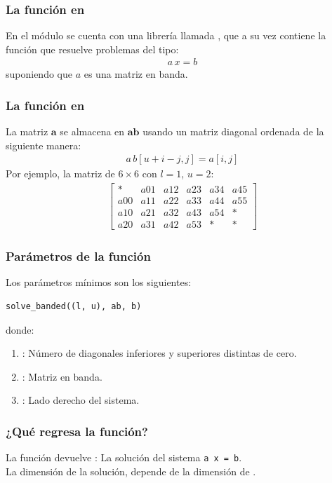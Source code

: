 \documentclass[12pt]{beamer}
\begin{document}
\begin{frame}
\frametitle{La función en }
En el módulo  se cuenta con una librería llamada , \pause que a su vez contiene la función  que resuelve problemas del tipo:
\begin{align*}
a \, x =  b
\end{align*}
suponiendo que $a$ es una matriz en banda.
\end{frame}
\begin{frame}
\frametitle{La función en }
La matriz $\mathbf{a}$ se almacena en $\mathbf{a b}$ usando un matriz diagonal ordenada de la siguiente manera:
\pause
\begin{align*}
a \, b [u + i - j, j] = a [i, j]
\end{align*}
\pause
Por ejemplo, la matriz de $6 \times 6$ con $l = 1$, $u = 2$:
\renewcommand{\arraystretch}{0.9}
\begin{align*}
\begin{bmatrix}
* & a01 & a12 & a23 & a34 & a45 \\
a00 & a11 & a22 & a33 & a44 & a55 \\
a10 & a21 & a32 & a43 & a54 & * \\
a20 & a31 & a42 & a53 & * & * 
\end{bmatrix}
\end{align*}
\end{frame}
\begin{frame}[fragile]
\frametitle{Parámetros de la función}
Los parámetros mínimos son los siguientes:
\pause
\begin{verbatim}
solve_banded((l, u), ab, b)
\end{verbatim}
\pause
donde:
\begin{enumerate}[<+->]
\item {}: Número de diagonales inferiores y superiores distintas de cero.
\item {}: Matriz en banda.
\item {}: Lado derecho del sistema.
\end{enumerate}
\end{frame}
\begin{frame}
\frametitle{¿Qué regresa la función?}
La función devuelve : La solución del sistema \texttt{a x = b}.
\\
\bigskip
La dimensión de la solución, depende de la dimensión de .
\end{frame}
\end{document}
